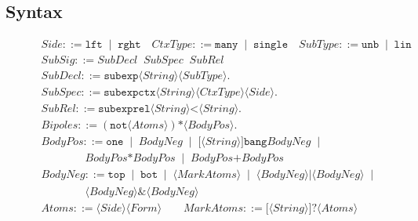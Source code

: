 \documentclass{llncs}
\newcommand{\tup}[1]{\langle#1\rangle}
\begin{document}
\vspace{-2mm}

\subsection{Syntax}

\begin{figure}[t]
{\small
\[
\begin{array}{lcl}
Side ::= \texttt{lft} \;\;|\;\; \texttt{rght} \quad 
CtxType ::=  \texttt{many} \;\;|\;\; \texttt{single} \quad
SubType ::=  \texttt{unb} \;\;|\;\; \texttt{lin} \\[2pt]
SubSig ::= SubDecl \;\; SubSpec \;\; SubRel \\[2pt]
SubDecl ::= \texttt{subexp} \tup{String} \tup{SubType}.\\[2pt]
SubSpec ::= \texttt{subexpctx} \tup{String} \tup{CtxType} \tup{Side}.\\[2pt]
SubRel ::= \texttt{subexprel} \tup{String} \texttt{<} \tup{String}. \\[2pt]
Bipoles ::= (\texttt{not} \tup{Atoms}) \texttt{*} \tup{BodyPos}. \\[2pt]
BodyPos ::=\texttt{one} \;\;|\;\; BodyNeg \;\;|\;\; \texttt{[}\tup{String}\texttt{]bang} BodyNeg \;\;|\;\;\\ 
        \qquad\qquad BodyPos \texttt{*} BodyPos \;\;|\;\; BodyPos \texttt{+} BodyPos \\[2pt]
BodyNeg ::= \texttt{top} \;\;|\;\; \texttt{bot} \;\;|\;\; \tup{MarkAtoms} \;\;|\;\; \tup{BodyNeg}|\tup{BodyNeg} \;\;|\;\; \\
        \qquad \qquad \tup{BodyNeg} \texttt{\&} \tup{BodyNeg}\\[2pt]
Atoms ::=\tup{Side} \tup{Form} \qquad MarkAtoms ::=  \texttt{[}\tup{String}\texttt{]?} \tup{Atoms} \\
\end{array}
\]
}
\end{figure}
\end{document}
